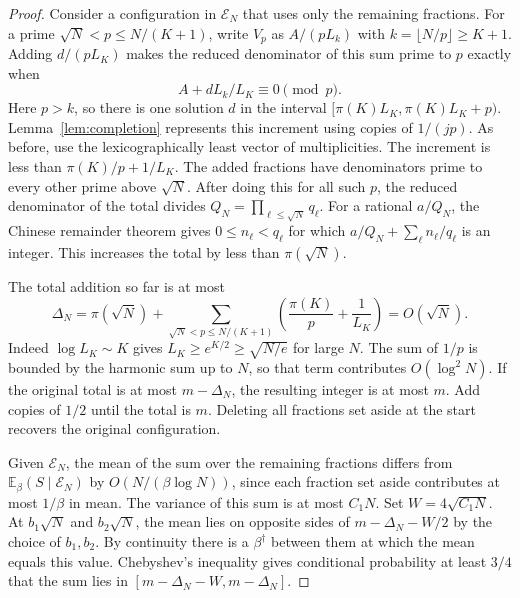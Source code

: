 \documentclass[11pt]{amsart}
\theoremstyle{remark}
\newcommand{\Ee}{\mathbb E}
\begin{document}
\begin{proof}
Consider a configuration in \(\mathcal E_N\) that uses only the remaining fractions. For a prime \(\sqrt N<p\le N/(K+1)\), write \(V_p\) as \(A/(pL_k)\) with \(k=\lfloor N/p\rfloor\ge K+1\). Adding \(d/(pL_K)\) makes the reduced denominator of this sum prime to \(p\) exactly when
\[
 A+dL_k/L_K\equiv0\pmod p .
\]
Here \(p>k\), so there is one solution \(d\) in the interval \([\pi(K)L_K,\pi(K)L_K+p)\). Lemma~\ref{lem:completion} represents this increment using copies
of \(1/(jp)\). As before, use the lexicographically least vector of
multiplicities. The increment is less than \(\pi(K)/p+1/L_K\). The added fractions have denominators prime to every other prime above \(\sqrt N\). After doing this for all such \(p\), the reduced denominator of the total divides \(Q_N=\prod_{\ell\le\sqrt N}q_\ell\). For a rational \(a/Q_N\), the Chinese remainder theorem gives \(0\le n_\ell<q_\ell\) for which \(a/Q_N+\sum_\ell n_\ell/q_\ell\) is an integer. This increases the total by less than \(\pi(\sqrt N)\).

The total addition so far is at most
\[
 \Delta_N=\pi(\sqrt N)+
 \sum_{\sqrt N<p\le N/(K+1)}\left(\frac{\pi(K)}p+\frac1{L_K}\right)
 =O(\sqrt N).
\]
Indeed \(\log L_K\sim K\) gives \(L_K\ge e^{K/2}\ge\sqrt{N/e}\) for large \(N\). The sum of \(1/p\) is bounded by the harmonic sum up to \(N\), so that term contributes \(O(\log^2N)\). If the original total is at most \(m-\Delta_N\), the resulting integer is at most \(m\). Add copies of \(1/2\) until the total is \(m\). Deleting all fractions set aside at the start recovers the original configuration.

Given \(\mathcal E_N\), the mean of the sum over the remaining fractions differs from \(\Ee_\beta(S\mid \mathcal E_N)\) by \(O(N/(\beta\log N))\), since each fraction set aside contributes at most \(1/\beta\) in mean. The variance of this sum is at most \(C_1 N\). Set \(W=4\sqrt{C_1 N}\). At \(b_1\sqrt N\) and \(b_2\sqrt N\), the mean lies on opposite sides of \(m-\Delta_N-W/2\) by the choice of \(b_1,b_2\). By continuity there is a \(\beta^\dagger\) between them at which the mean equals this value. Chebyshev's inequality gives conditional probability at least \(3/4\) that the sum lies in \([m-\Delta_N-W,m-\Delta_N]\).


\end{proof}
\end{document}
